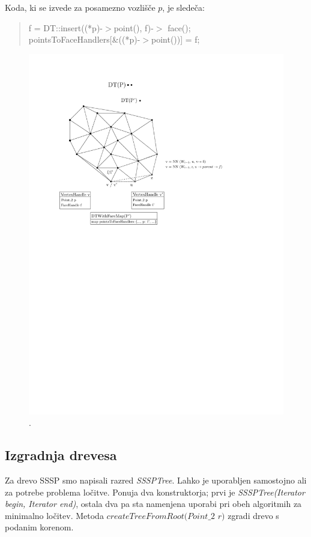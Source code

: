 \documentclass[a4paper, 12pt]{book}
\newcommand{\U}{\texttt{\_}}
\begin{document}
Koda, ki se izvede za posamezno vozlišče $p$, je sledeča:

\begin{quote}
f = DT::insert((*p)-$>$point(), f)-$>$ face();\\
pointsToFaceHandlers[\&((*p)-$>$point())] = f;
\end{quote}

\begin{figure}
\centerline{\includegraphics{pics/pointsToFaceHandlers.pdf}}
\caption{.}
\label{pointsToFace}
\end{figure}

\subsection{Izgradnja drevesa} 

Za drevo SSSP smo napisali razred \textit{SSSPTree}. Lahko je uporabljen samostojno ali za potrebe problema ločitve. Ponuja dva konstruktorja; prvi je \textit{SSSPTree(Iterator begin, Iterator end)}, ostala dva pa sta namenjena uporabi pri obeh algoritmih za minimalno ločitev. Metoda $createTreeFromRoot(Point\U 2$ $r)$ zgradi drevo s podanim korenom. 
\end{document}
